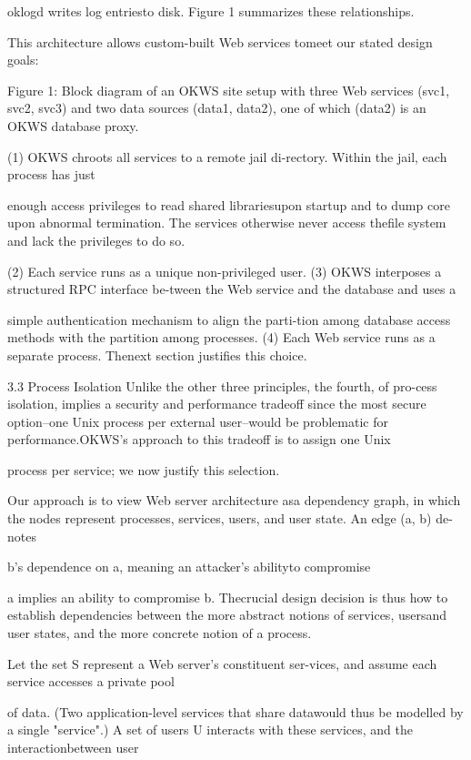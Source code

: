 oklogd writes log entriesto disk. Figure 1 summarizes these relationships.

This architecture allows custom-built Web services tomeet our stated design goals:

Figure 1: Block diagram of an OKWS site setup with three Web
services (svc1, svc2, svc3) and two data sources (data1, data2),
one of which (data2) is an OKWS database proxy.

(1) OKWS chroots all services to a remote jail di-rectory. Within the jail, each process has just

enough access privileges to read shared librariesupon startup and to dump core upon abnormal termination. The services otherwise never access thefile system and lack the privileges to do so.

(2) Each service runs as a unique non-privileged user.
(3) OKWS interposes a structured RPC interface be-tween the Web service and the database and uses a

simple authentication mechanism to align the parti-tion among database access methods with the partition among processes.
(4) Each Web service runs as a separate process. Thenext section justifies this choice.

3.3 Process Isolation
Unlike the other three principles, the fourth, of pro-cess isolation, implies a security and performance tradeoff since the most secure option--one Unix process per
external user--would be problematic for performance.OKWS's approach to this tradeoff is to assign one Unix

process per service; we now justify this selection.

Our approach is to view Web server architecture asa dependency graph, in which the nodes represent processes, services, users, and user state. An edge (a, b) de-notes

b's dependence on a, meaning an attacker's abilityto compromise

a implies an ability to compromise b. Thecrucial design decision is thus how to establish dependencies between the more abstract notions of services, usersand user states, and the more concrete notion of a process.

Let the set S represent a Web server's constituent ser-vices, and assume each service accesses a private pool

of data. (Two application-level services that share datawould thus be modelled by a single "service".) A set of
users U interacts with these services, and the interactionbetween user

